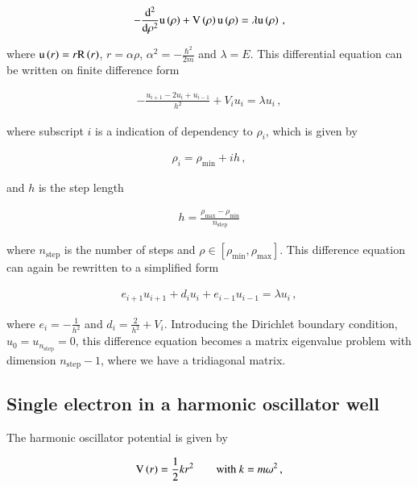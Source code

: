 \documentclass[11pt,english,a4paper]{article}
\begin{document}
\begin{flushleft}
\begin{align}
-\frac{\mathrm{d}^2}{\mathrm{d}\rho^2}\mathrm{u}\left({\rho}\right) + \mathrm{V}\left({\rho}\right)\mathrm{u}\left({\rho}\right) = \lambda\mathrm{u}\left({\rho}\right) \,,
\label{eq_1}
\end{align}

where $\mathrm{u}\left({r}\right) = r \mathrm{R}\left({r}\right)$, $r = \alpha \rho$, $\alpha^2 = - \frac{\hbar^2}{2m}$ and $\lambda = E$. This differential equation can be written on finite difference form

\begin{align*}
-\frac{u_{i+1}-2 u_i+u_{i-1}}{h^2} + V_i u_i = \lambda u_i \,,
\end{align*}

where subscript $i$ is a indication of dependency to $\rho_i$, which is given by

\begin{align*}
\rho_i = \rho_{\mathrm{min}} + i h \,,
\end{align*}

and $h$ is the step length

\begin{align*}
h = \frac{\rho_{\mathrm{max}}-\rho_{\text{min}}}{n_{\mathrm{step}}} 
\end{align*}

where $n_{\mathrm{step}}$ is the number of steps and $\rho\in\left[\rho_{\mathrm{min}},\rho_{\mathrm{max}}\right]$. This difference equation can again be rewritten to a simplified form

\begin{align}
e_{i+1} u_{i+1} + d_i u_i + e_{i-1}  u_{i-1} = \lambda u_i \,,
\label{eq_2}
\end{align}

where $e_i = - \frac{1}{h^2}$ and $d_i = \frac{2}{h^2} + V_i$. Introducing the Dirichlet boundary condition, $u_0 = u_{n_{\mathrm{step}}} = 0$, this difference equation becomes a matrix eigenvalue problem with dimension $n_{\mathrm{step}}-1$, where we have a tridiagonal matrix.

\subsection{Single electron in a harmonic oscillator well}

The harmonic oscillator potential is given by

\begin{align*}
\mathrm{V}\left({r}\right) = \frac{1}{2}kr^2 \qquad \text{with } k = m\omega^2 \,,
\end{align*}


\end{flushleft}
\end{document}
